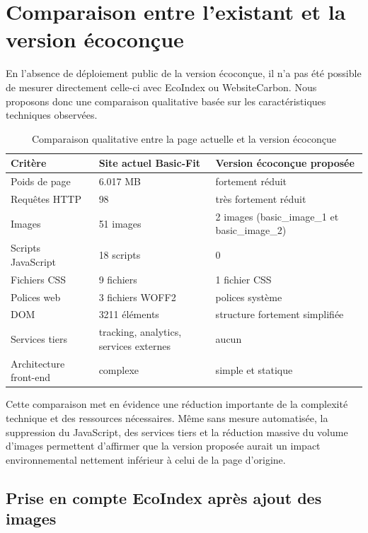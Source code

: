 \documentclass[11pt,a4paper]{article}
\begin{document}
\section{Comparaison entre l'existant et la version écoconçue}

En l'absence de déploiement public de la version écoconçue, il n'a pas été possible de mesurer directement celle-ci avec EcoIndex ou WebsiteCarbon. Nous proposons donc une comparaison qualitative basée sur les caractéristiques techniques observées.

\begin{table}[H]
\centering
\caption{Comparaison qualitative entre la page actuelle et la version écoconçue}
\begin{tabularx}{\textwidth}{|Y|Y|Y|}
\hline
Critère & Site actuel Basic-Fit & Version écoconçue proposée \\
\hline
Poids de page & 6.017 MB & fortement réduit \\
\hline
Requêtes HTTP & 98 & très fortement réduit \\
\hline
Images & 51 images & 2 images (basic\_image\_1 et basic\_image\_2) \\
\hline
Scripts JavaScript & 18 scripts & 0 \\
\hline
Fichiers CSS & 9 fichiers & 1 fichier CSS \\
\hline
Polices web & 3 fichiers WOFF2 & polices système \\
\hline
DOM & 3211 éléments & structure fortement simplifiée \\
\hline
Services tiers & tracking, analytics, services externes & aucun \\
\hline
Architecture front-end & complexe & simple et statique \\
\hline
\end{tabularx}
\end{table}

Cette comparaison met en évidence une réduction importante de la complexité technique et des ressources nécessaires. Même sans mesure automatisée, la suppression du JavaScript, des services tiers et la réduction massive du volume d'images permettent d'affirmer que la version proposée aurait un impact environnemental nettement inférieur à celui de la page d'origine.

\subsection{Prise en compte EcoIndex après ajout des images}
\end{document}

